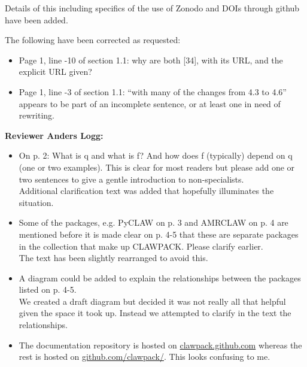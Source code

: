\documentclass{letter}
\begin{document}
\begin{letter}
\begin{itemize}
    Details of this including specifics of the use of Zonodo and DOIs through
    github have been added.
\end{itemize}

The following have been corrected as requested:
\begin{itemize}
    \item Page 1, line -10 of section 1.1: why are both [34], with its URL, and
    the explicit URL given?
    \item Page 1, line -3 of section 1.1: ``with many of the changes from 4.3 to
    4.6'' appears to be part of an incomplete sentence, or at least one
    in need of rewriting.
\end{itemize}


\textbf{\large Reviewer Anders Logg:}
\begin{itemize} 
    \item On p. 2: What is q and what is f? And how does f (typically) depend on
    q (one or two examples). This is clear for most readers but please add one
    or two sentences to give a gentle introduction to non-specialists. \\

    Additional clarification text was added that hopefully illuminates the
    situation. \\

    \item Some of the packages, e.g. PyCLAW on p. 3 and AMRCLAW on p. 4 are
    mentioned before it is made clear on p. 4-5 that these are separate packages
    in the collection that make up CLAWPACK. Please clarify earlier. \\

    The text has been slightly rearranged to avoid this. \\

    \item A diagram could be added to explain the relationships between the
    packages listed on p. 4-5. \\

    We created a draft diagram but decided it was not really all that helpful
    given the space it took up.  Instead we attempted to clarify in the text the
    relationships. \\

    \item The documentation repository is hosted on \url{clawpack.github.com} whereas
    the rest is hosted on \url{github.com/clawpack/}. This looks confusing to
    me. \\


\end{itemize}
\end{letter}
\end{document}
